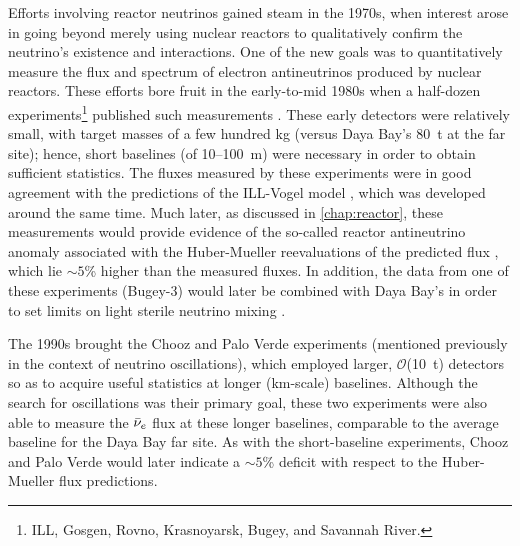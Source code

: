 \documentclass[../thesis.tex]{subfiles}
\begin{document}
Efforts involving reactor neutrinos gained steam in the 1970s, when interest arose in going beyond merely using nuclear reactors to qualitatively confirm the neutrino's existence and interactions. One of the new goals was to quantitatively measure the flux and spectrum of electron antineutrinos produced by nuclear reactors. These efforts bore fruit in the early-to-mid 1980s when a half-dozen experiments\footnote{ILL, Gosgen, Rovno, Krasnoyarsk, Bugey, and Savannah River.} published such measurements \cite{PhysRevD.24.1097,Zacek:1986cu,Afonin:1985rw,Aleshin_2008,Abbes:1995nc,Sobel:1982gf}. These early detectors were relatively small, with target masses of a few hundred kg (versus Daya Bay's 80~t at the far site); hence, short baselines (of 10--100~m) were necessary in order to obtain sufficient statistics. The fluxes measured by these experiments were in good agreement with the predictions of the ILL-Vogel model \cite{SCHRECKENBACH1985325,VONFEILITZSCH1982162,HAHN1989365,PhysRevC.24.1543}, which was developed around the same time. Much later, as discussed in \autoref{chap:reactor}, these measurements would provide evidence of the so-called reactor antineutrino anomaly \cite{PhysRevD.83.073006} associated with the Huber-Mueller reevaluations of the predicted flux \cite{PhysRevC.84.024617,PhysRevC.83.054615}, which lie $\sim5$\% higher than the measured fluxes. In addition, the data from one of these experiments (Bugey-3) would later be combined with Daya Bay's in order to set limits on light sterile neutrino mixing \cite{PhysRevLett.117.151801}.

The 1990s brought the Chooz \cite{Apollonio_2003} and Palo Verde \cite{PhysRevD.64.112001} experiments (mentioned previously in the context of neutrino oscillations), which employed larger, $\mathcal{O}$(10~t) detectors so as to acquire useful statistics at longer (km-scale) baselines. Although the search for oscillations was their primary goal, these two experiments were also able to measure the $\bar\nu_e$ flux at these longer baselines, comparable to the average baseline for the Daya Bay far site. 
As with the short-baseline experiments, Chooz and Palo Verde would later indicate a $\sim5$\% deficit with respect to the Huber-Mueller flux predictions.
\end{document}

